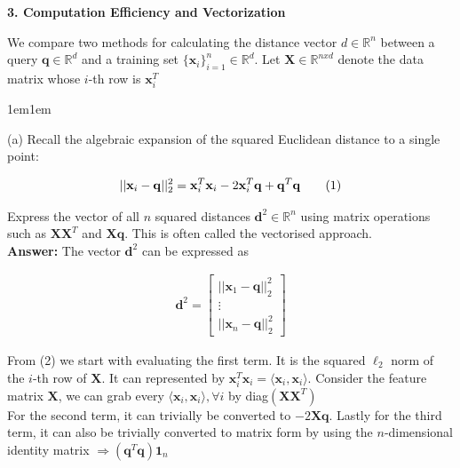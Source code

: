 \documentclass[11pt]{article}
\newcommand\numberthis{\addtocounter{equation}{1}\tag{\theequation}}
\begin{document}
    \textbf{3. Computation Efficiency and Vectorization}

    We compare two methods for calculating the distance vector $d \in \mathbb{R}^n$ between a 
    query $\mathbf{q} \in \mathbb{R}^d$ and a training set $\{\mathbf{x}_i\}_{i = 1}^n \in 
    \mathbb{R}^d$. Let $\mathbf{X} \in \mathbb{R}^{n x d}$ denote the data matrix whose 
    $i$-th row is $\mathbf{x}_i^T$ \\

    \begin{adjustwidth}{1em}{1em}
    
    (a) Recall the algebraic expansion of the squared Euclidean distance to a single point: 

    \begin{align*}
        ||\mathbf{x}_i - \mathbf{q}||_2^2 = \mathbf{x}_i^T \mathbf{x}_i - 2\mathbf{x}_i^T 
        \mathbf{q} + \mathbf{q}^T\mathbf{q} \numberthis
    \end{align*}

    Express the vector of all $n$ squared distances $\mathbf{d}^2 \in \mathbb{R}^n$ using matrix 
    operations such as $\mathbf{X}\mathbf{X}^T$ and $\mathbf{X}\mathbf{q}$. This is often
    called the vectorised approach. \\

    \textbf{Answer:} The vector $\mathbf{d}^2$ can be expressed as 
    
    \begin{align*}
        \mathbf{d}^2 = \begin{bmatrix}
            ||\mathbf{x}_1 - \mathbf{q}||_2^2 \\ \vdots \\ ||\mathbf{x}_n - \mathbf{q}||_2^2
        \end{bmatrix}
    \end{align*}

    From (2) we start with evaluating the first term. It is the squared $\ell_2$ norm of the 
    $i$-th row of $\mathbf{X}$. It can represented by $\mathbf{x}_i^T\mathbf{x}_i = \langle 
    \mathbf{x}_i, \mathbf{x}_i \rangle$. Consider the feature matrix $\mathbf{X}$, we can grab
    every $\langle \mathbf{x}_i, \mathbf{x}_i \rangle, \forall i$ by diag$(\mathbf{XX}^T)$ \\ 

    For the second term, it can trivially be converted to $-2\mathbf{Xq}$. Lastly for the third
    term, it can also be trivially converted to matrix form by using the $n$-dimensional
    identity matrix $\Rightarrow (\mathbf{q}^T\mathbf{q})\mathbf{1}_n$


\end{adjustwidth}
\end{document}

